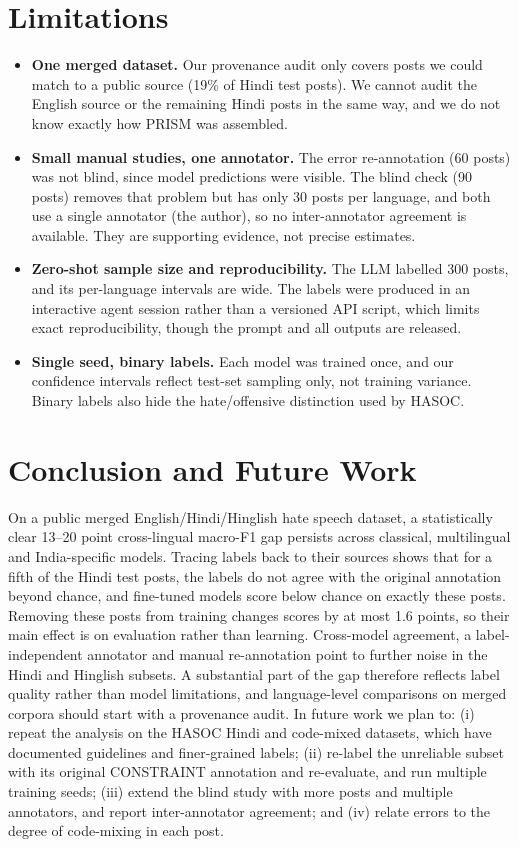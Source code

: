 \documentclass[11pt,a4paper]{article}
\begin{document}
\section{Limitations}
\begin{itemize}
  \item \textbf{One merged dataset.} Our provenance audit only covers posts we could match to a public source (19\% of Hindi test posts). We cannot audit the English source or the remaining Hindi posts in the same way, and we do not know exactly how PRISM was assembled.
  \item \textbf{Small manual studies, one annotator.} The error re-annotation (60 posts) was not blind, since model predictions were visible. The blind check (90 posts) removes that problem but has only 30 posts per language, and both use a single annotator (the author), so no inter-annotator agreement is available. They are supporting evidence, not precise estimates.
  \item \textbf{Zero-shot sample size and reproducibility.} The LLM labelled 300 posts, and its per-language intervals are wide. The labels were produced in an interactive agent session rather than a versioned API script, which limits exact reproducibility, though the prompt and all outputs are released.
  \item \textbf{Single seed, binary labels.} Each model was trained once, and our confidence intervals reflect test-set sampling only, not training variance. Binary labels also hide the hate/offensive distinction used by HASOC.
\end{itemize}

\section{Conclusion and Future Work}
On a public merged English/Hindi/Hinglish hate speech dataset, a statistically clear 13--20 point cross-lingual macro-F1 gap persists across classical, multilingual and India-specific models.
Tracing labels back to their sources shows that for a fifth of the Hindi test posts, the labels do not agree with the original annotation beyond chance, and fine-tuned models score below chance on exactly these posts.
Removing these posts from training changes scores by at most 1.6 points, so their main effect is on evaluation rather than learning.
Cross-model agreement, a label-independent annotator and manual re-annotation point to further noise in the Hindi and Hinglish subsets.
A substantial part of the gap therefore reflects label quality rather than model limitations, and language-level comparisons on merged corpora should start with a provenance audit.
In future work we plan to:
(i) repeat the analysis on the HASOC Hindi and code-mixed datasets, which have documented guidelines and finer-grained labels;
(ii) re-label the unreliable subset with its original CONSTRAINT annotation and re-evaluate, and run multiple training seeds;
(iii) extend the blind study with more posts and multiple annotators, and report inter-annotator agreement; and
(iv) relate errors to the degree of code-mixing in each post.
\end{document}
